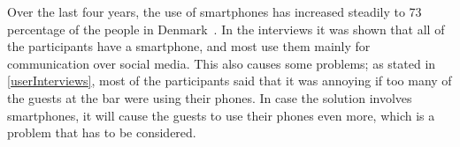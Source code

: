 Over the last four years, the use of smartphones has increased steadily to 73 percentage of the people in Denmark~\cite{smartphone2014}. In the interviews it was shown that all of the participants have a smartphone, and most use them mainly for communication over social media. This also causes some problems; as stated in \cref{userInterviews}, most of the participants said that it was annoying if too many of the guests at the bar were using their phones. In case the solution involves smartphones, it will cause the guests to use their phones even more, which is a problem that has to be considered.